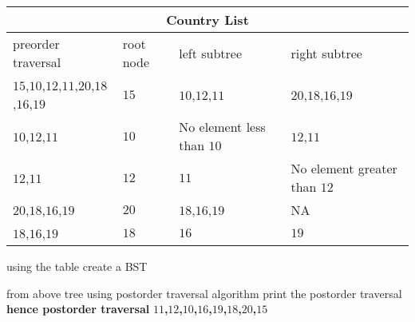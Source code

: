 \documentclass[journal,12pt,twocolumn]{IEEEtran}
\begin{document}
\begin{tabular}{ |p{4cm}||p{0.8cm}|p{2cm}|p{2cm}|  }
 \hline
 \multicolumn{4}{|c|}{Country List} \\
 \hline
 preorder traversal& root node&left subtree&right subtree\\
 \hline
 $15$,$10$,$12$,$11$,$20$,$18$,$16$,$19$ & $15$ &$10$,$12$,$11$&$20$,$18$,$16$,$19$ \\
 $10$,$12$,$11$&$10$&No element less than $10$&$12$,$11$\\
 $12$,$11$&$12$& $11$ & No element greater than $12$ \\
 $20$,$18$,$16$,$19$&$20$&  $18$,$16$,$19$ &  NA\\
 $18$,$16$,$19$&   $18$  &$16$&$19$\\
 
 \hline
\end{tabular}

\newline
\vspace{5mm}
using the table create a BST 
\vspace{5mm}


\vspace{10mm}
\newline

from above tree using postorder traversal algorithm print the postorder traversal
\newline
\textbf{hence postorder traversal}
\textbf{$11$,$12$,$10$,$16$,$19$,$18$,$20$,$15$}
\end{document}
